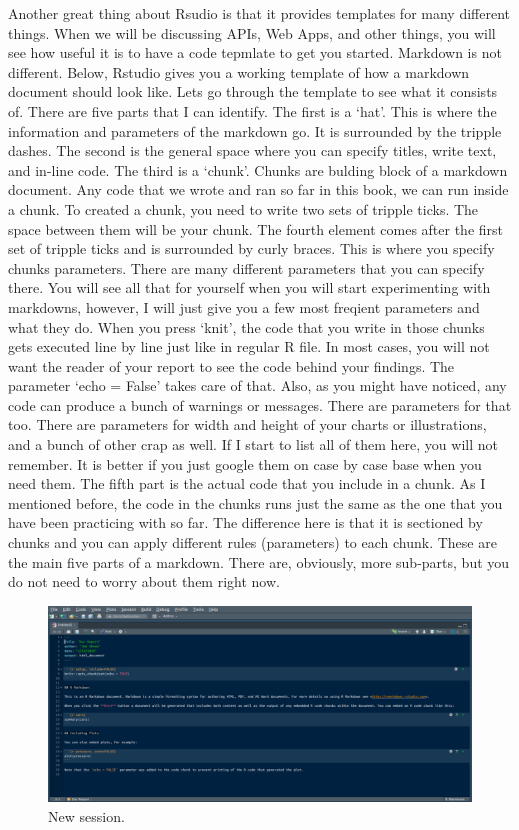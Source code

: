 \documentclass[]{book}
\begin{document}
Another great thing about Rsudio is that it provides templates for many different things. When we will be discussing APIs, Web Apps, and other things, you will see how useful it is to have a code tepmlate to get you started. Markdown is not different. Below, Rstudio gives you a working template of how a markdown document should look like. Lets go through the template to see what it consists of. There are five parts that I can identify. The first is a `hat'. This is where the information and parameters of the markdown go. It is surrounded by the tripple dashes. The second is the general space where you can specify titles, write text, and in-line code. The third is a `chunk'. Chunks are bulding block of a markdown document. Any code that we wrote and ran so far in this book, we can run inside a chunk. To created a chunk, you need to write two sets of tripple ticks. The space between them will be your chunk. The fourth element comes after the first set of tripple ticks and is surrounded by curly braces. This is where you specify chunks parameters. There are many different parameters that you can specify there. You will see all that for yourself when you will start experimenting with markdowns, however, I will just give you a few most freqient parameters and what they do. When you press `knit', the code that you write in those chunks gets executed line by line just like in regular R file. In most cases, you will not want the reader of your report to see the code behind your findings. The parameter `echo = False' takes care of that. Also, as you might have noticed, any code can produce a bunch of warnings or messages. There are parameters for that too. There are parameters for width and height of your charts or illustrations, and a bunch of other crap as well. If I start to list all of them here, you will not remember. It is better if you just google them on case by case base when you need them. The fifth part is the actual code that you include in a chunk. As I mentioned before, the code in the chunks runs just the same as the one that you have been practicing with so far. The difference here is that it is sectioned by chunks and you can apply different rules (parameters) to each chunk. These are the main five parts of a markdown. There are, obviously, more sub-parts, but you do not need to worry about them right now.

\begin{figure}
\centering
\includegraphics{markdown1.png}
\caption{New session.}
\end{figure}
\end{document}
